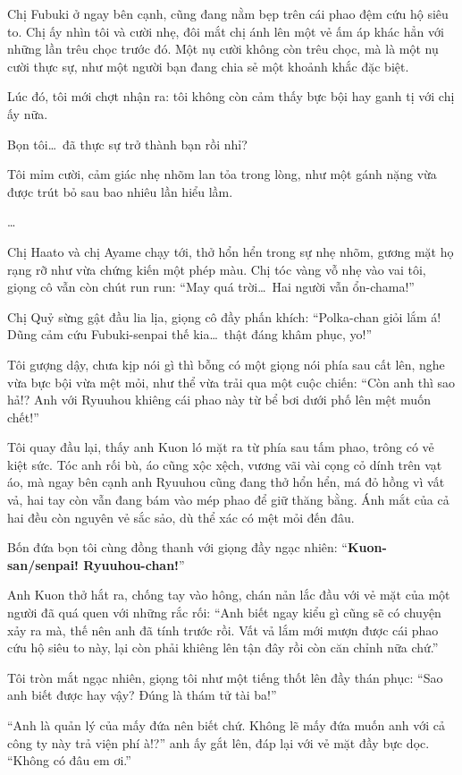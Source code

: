 \documentclass[../main.tex]{subfiles}
\begin{document}
Chị Fubuki ở ngay bên cạnh, cũng đang nằm bẹp trên cái phao đệm cứu hộ siêu to. Chị ấy nhìn tôi và cười nhẹ, đôi mắt chị ánh lên một vẻ ấm áp khác hẳn với những lần trêu chọc trước đó. Một nụ cười không còn trêu chọc, mà là một nụ cười thực sự, như một người bạn đang chia sẻ một khoảnh khắc đặc biệt.

Lúc đó, tôi mới chợt nhận ra: tôi không còn cảm thấy bực bội hay ganh tị với chị ấy nữa.

Bọn tôi\dots\ đã thực sự trở thành bạn rồi nhỉ?

Tôi mỉm cười, cảm giác nhẹ nhõm lan tỏa trong lòng, như một gánh nặng vừa được trút bỏ sau bao nhiêu lần hiểu lầm.

\dots

Chị Haato và chị Ayame chạy tới, thở hổn hển trong sự nhẹ nhõm, gương mặt họ rạng rỡ như vừa chứng kiến một phép màu. Chị tóc vàng vỗ nhẹ vào vai tôi, giọng cô vẫn còn chút run run: ``May quá trời\dots\ Hai người vẫn ổn-chama!''

Chị Quỷ sừng gật đầu lia lịa, giọng cô đầy phấn khích: ``Polka-chan giỏi lắm á! Dũng cảm cứu Fubuki-senpai thế kia\dots\ thật đáng khâm phục, yo!''

Tôi gượng dậy, chưa kịp nói gì thì bỗng có một giọng nói phía sau cất lên, nghe vừa bực bội vừa mệt mỏi, như thể vừa trải qua một cuộc chiến: ``Còn anh thì sao hả!? Anh với Ryuuhou khiêng cái phao này từ bể bơi dưới phố lên mệt muốn chết!''

Tôi quay đầu lại, thấy anh Kuon ló mặt ra từ phía sau tấm phao, trông có vẻ kiệt sức. Tóc anh rối bù, áo cũng xộc xệch, vương vãi vài cọng cỏ dính trên vạt áo, mà ngay bên cạnh anh Ryuuhou cũng đang thở hổn hển, má đỏ hồng vì vất vả, hai tay còn vẫn đang bám vào mép phao để giữ thăng bằng. Ánh mắt của cả hai đều còn nguyên vẻ sắc sảo, dù thể xác có mệt mỏi đến đâu.

Bốn đứa bọn tôi cùng đồng thanh với giọng đầy ngạc nhiên: ``\textbf{Kuon-san/senpai! Ryuuhou-chan!}''

Anh Kuon thở hắt ra, chống tay vào hông, chán nản lắc đầu với vẻ mặt của một người đã quá quen với những rắc rối: ``Anh biết ngay kiểu gì cũng sẽ có chuyện xảy ra mà, thế nên anh đã tính trước rồi. Vất vả lắm mới mượn được cái phao cứu hộ siêu to này, lại còn phải khiêng lên tận đây rồi còn căn chỉnh nữa chứ.''

Tôi tròn mắt ngạc nhiên, giọng tôi như một tiếng thốt lên đầy thán phục: ``Sao anh biết được hay vậy? Đúng là thám tử tài ba!''

``Anh là quản lý của mấy đứa nên biết chứ. Không lẽ mấy đứa muốn anh với cả công ty này trả viện phí à!?'' anh ấy gắt lên, đáp lại với vẻ mặt đầy bực dọc. ``Không có đâu em ơi.''
\end{document}
